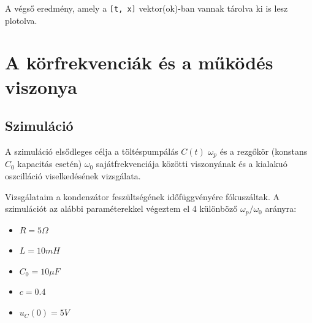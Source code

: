 \documentclass[12pt,a4paper]{article}
\begin{document}
A végső eredmény, amely a \texttt{[t, x]} vektor(ok)-ban vannak tárolva ki is lesz plotolva.

\section{A körfrekvenciák és a működés viszonya}

\subsection{Szimuláció}
A szimuláció elsődleges célja a töltéspumpálás $C(t)$ $\omega_p$ és a rezgőkör (konstans $C_0$ kapacitás esetén) $\omega_0$ sajátfrekvenciája közötti viszonyának és a
kialakuó oszcilláció viselkedésének vizsgálata.

Vizsgálataim a kondenzátor feszültségének időfüggvényére fókuszáltak. A szimulációt az alábbi paraméterekkel végeztem el 4 különböző $\omega_p / \omega_0$ arányra:

\begin{itemize}
    \item $R = 5 \Omega$
    \item $L = 10 mH$
    \item $C_0 = 10 \mu F$
    \item $c = 0.4$
    \item $u_C(0) = 5 V$
\end{itemize}
\end{document}
